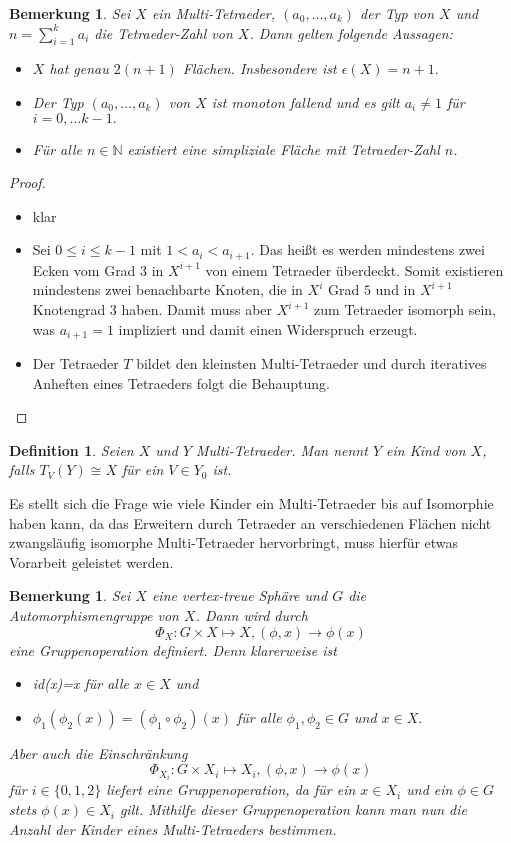 \documentclass[12pt,titlepage,twoside,cleardoublepage]{article}
\theoremstyle{nummermitklammern}
\newtheorem{definition}[temp]{Definition}
\newtheorem{bemerkung}[temp]{Bemerkung}
\newtheorem{definition}[zahl]{Definition}
\newtheorem{bemerkung}[zahl]{Bemerkung}
\numberwithin{equation}{section}
\begin{document}
\begin{bemerkung}
Sei $X$ ein Multi-Tetraeder, $(a_0,\ldots,a_k)$ der Typ von $X$ und $n=\sum_{i=1}^{k}a_i$ die Tetraeder-Zahl von $X$. Dann gelten folgende Aussagen: 
\begin{itemize}
\item $X$ hat genau $2(n+1)$ Flächen. Insbesondere ist $\epsilon(X)=n+1.$
\item Der Typ $(a_0,\ldots,a_k)$ von $X$ ist monoton fallend und es gilt $a_i\neq 1$ für $i=0,\ldots k-1.$
\item  Für alle $n \in \mathbb{N}$ existiert eine simpliziale Fläche mit Tetraeder-Zahl $n$.
\end{itemize}
\end{bemerkung}
\begin{proof}
\begin{itemize}
\item klar
\item Sei $0\leq i \leq k-1$ mit $1<a_i <a_{i+1}.$ Das heißt es werden mindestens zwei Ecken vom Grad 3 in $X^{i+1}$ von einem Tetraeder überdeckt. Somit existieren mindestens zwei benachbarte Knoten, die in $X^i$ Grad $5$ und in $X^{i+1}$ Knotengrad $3$ haben. Damit muss aber $X^{i+1}$ zum Tetraeder isomorph sein, was $a_{i+1}=1$ impliziert und damit einen Widerspruch erzeugt.
 \item Der Tetraeder $T$ bildet den kleinsten Multi-Tetraeder  und durch iteratives Anheften eines Tetraeders folgt die Behauptung.
\end{itemize}
\end{proof}
\begin{definition}
Seien $X$ und $Y$ Multi-Tetraeder. Man nennt $Y$ ein Kind von $X$, falls $T_V(Y)\cong X$ für ein $V\in Y_0$ ist.
\end{definition}
Es stellt sich die Frage wie viele Kinder ein Multi-Tetraeder bis auf Isomorphie haben kann, da das Erweitern durch Tetraeder an verschiedenen Flächen nicht zwangsläufig isomorphe Multi-Tetraeder hervorbringt, muss hierfür etwas Vorarbeit geleistet werden.
\begin{bemerkung} 
Sei $X$ eine vertex-treue Sphäre und $G$ die Automorphismengruppe von $X$. Dann wird durch 
\[
\Phi_X:G \times X\mapsto X,(\phi, x)\to \phi(x)
\] eine Gruppenoperation definiert. Denn klarerweise ist
\begin{itemize}
\item id(x)=x für alle $x\in X$ und
\item $\phi_1(\phi_2 (x))=(\phi_1 \circ\phi_2)(x)$ für alle $\phi_1,\phi_2 \in G$ und $x\in X.$
\end{itemize}
Aber auch die Einschränkung   
\[
\Phi_{X_i}:G \times X_i\mapsto X_i,(\phi, x)\to \phi(x)
\] für $i\in \{0,1,2\}$ liefert eine Gruppenoperation, da für ein $x\in X_i$ und ein $\phi\in G$ stets $\phi(x)\in X_i$ gilt. Mithilfe dieser Gruppenoperation kann man nun die Anzahl der Kinder eines Multi-Tetraeders bestimmen.
\end{bemerkung} 
\end{document}
